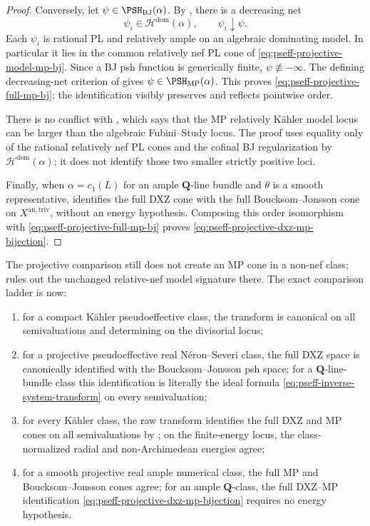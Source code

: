 \begin{proof}
Conversely, let $\psi\in\PSH_{\mathrm{BJ}}(\alpha)$.  By
\cite[Theorem~4.15(iii)]{BJ22}, there is a decreasing net
\[
                 \psi_i\in\mathcal H^{\mathrm{dom}}(\alpha),
                 \qquad \psi_i\downarrow\psi.
\]
Each $\psi_i$ is rational PL and relatively ample on an algebraic
dominating model.  In particular it lies in the common relatively nef PL
cone of \eqref{eq:pseff-projective-model-mp-bj}.  Since a BJ psh function
is generically finite, $\psi\not\equiv-\infty$.  The defining
decreasing-net criterion of \cite[Definition~4.3.1]{MP24} gives
$\psi\in\PSH_{\mathrm{MP}}(\alpha)$.  This proves
\eqref{eq:pseff-projective-full-mp-bj}; the identification visibly
preserves and reflects pointwise order.

There is no conflict with \cite[Remark~4.1.3]{MP24}, which says that the MP
relatively K\"ahler model locus can be larger than the algebraic
Fubini--Study locus.  The proof uses equality only of the rational
relatively nef PL cones and the cofinal BJ regularization by
$\mathcal H^{\mathrm{dom}}(\alpha)$; it does not identify those two
smaller strictly positive loci.

Finally, when $\alpha=c_1(L)$ for an ample $\mathbf Q$-line bundle
and $\theta$ is a smooth representative, \cite[Theorem~3.14]{DXZ23}
identifies the full DXZ cone with the full Boucksom--Jonsson cone on
$X^{\mathrm{an,triv}}$, without an energy hypothesis.  Composing this
order isomorphism with \eqref{eq:pseff-projective-full-mp-bj} proves
\eqref{eq:pseff-projective-dxz-mp-bijection}.
\end{proof}

The projective comparison still does not create an MP cone in a non-nef
class;  rules out the unchanged
relative-nef model signature there.  The exact comparison ladder is now:
\begin{enumerate}
\item for a compact K\"ahler pseudoeffective class, the transform is
      canonical on all semivaluations and determining on the divisorial
      locus;
\item for a projective pseudoeffective real N\'eron--Severi class, the full
      DXZ space is canonically identified with the Boucksom--Jonsson psh
      space; for a $\mathbf Q$-line-bundle class this identification is
      literally the ideal formula
      \eqref{eq:pseff-inverse-system-transform} on every semivaluation;
\item for every K\"ahler class, the raw transform identifies the full
      DXZ and MP cones on all semivaluations by
      ; on the finite-energy locus,
      the class-normalized radial and non-Archimedean energies agree;
\item for a smooth projective real ample numerical class, the full MP and
      Boucksom--Jonsson cones agree; for an ample $\mathbf Q$-class, the
      full DXZ--MP identification
      \eqref{eq:pseff-projective-dxz-mp-bijection} requires no energy
      hypothesis.
\end{enumerate}

